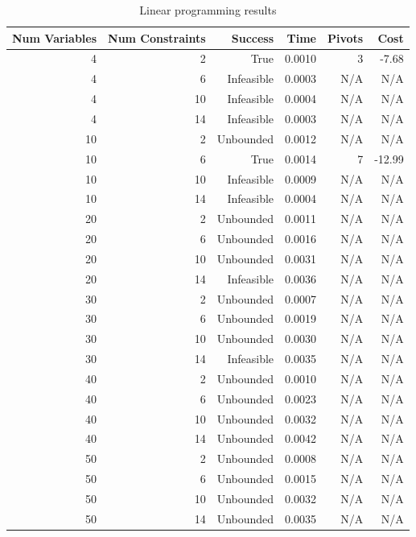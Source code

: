 \begin{table}[ht]
    \centering
    \begin{tabular}{rrrrrr}
        \toprule
        Num Variables & Num Constraints & Success & Time & Pivots & Cost \\
        \midrule
        4 & 2 & True & 0.0010 & 3 & -7.68 \\
		4 & 6 & Infeasible & 0.0003 & N/A & N/A \\
		4 & 10 & Infeasible & 0.0004 & N/A & N/A \\
		4 & 14 & Infeasible & 0.0003 & N/A & N/A \\
		10 & 2 & Unbounded & 0.0012 & N/A & N/A \\
		10 & 6 & True & 0.0014 & 7 & -12.99 \\
		10 & 10 & Infeasible & 0.0009 & N/A & N/A \\
		10 & 14 & Infeasible & 0.0004 & N/A & N/A \\
		20 & 2 & Unbounded & 0.0011 & N/A & N/A \\
		20 & 6 & Unbounded & 0.0016 & N/A & N/A \\
		20 & 10 & Unbounded & 0.0031 & N/A & N/A \\
		20 & 14 & Infeasible & 0.0036 & N/A & N/A \\
		30 & 2 & Unbounded & 0.0007 & N/A & N/A \\
		30 & 6 & Unbounded & 0.0019 & N/A & N/A \\
		30 & 10 & Unbounded & 0.0030 & N/A & N/A \\
		30 & 14 & Infeasible & 0.0035 & N/A & N/A \\
		40 & 2 & Unbounded & 0.0010 & N/A & N/A \\
		40 & 6 & Unbounded & 0.0023 & N/A & N/A \\
		40 & 10 & Unbounded & 0.0032 & N/A & N/A \\
		40 & 14 & Unbounded & 0.0042 & N/A & N/A \\
		50 & 2 & Unbounded & 0.0008 & N/A & N/A \\
		50 & 6 & Unbounded & 0.0015 & N/A & N/A \\
		50 & 10 & Unbounded & 0.0032 & N/A & N/A \\
		50 & 14 & Unbounded & 0.0035 & N/A & N/A \\
        \bottomrule
    \end{tabular}
    \caption{Linear programming results}
    \label{tab:lp-results}
\end{table}